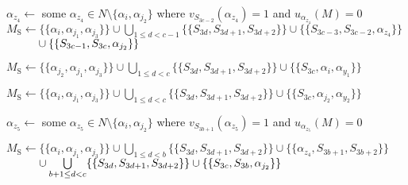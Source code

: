 \begin{breakablealgorithm}
\begin{algorithmic}
\vspace*{1.5pt}

\State $\alpha_{z_4} \gets$ some $\alpha_{z_4} \in N\setminus \{ \alpha_i, \alpha_{j_2} \}$ where $v_{S_{3c-2}}(\alpha_{z_4})=1 $ and $ u_{\alpha_{z_4}}(M)=0$
\vspace*{1.5pt}
\State $M_{\textrm{S}} \gets \{\{ \alpha_i, \alpha_{j_1}, \alpha_{j_3} \}\} \cup \bigcup\limits_{1 \leq d < c - 1}\{ \{ S_{3d}, S_{3d+1}, S_{3d+2} \} \} \cup \{\{ S_{3c-3}, S_{3c-2}, \alpha_{z_4} \}\}$
\State $\hphantom{M' \gets } \cup \{\{ S_{3c-1}, S_{3c}, \alpha_{j_2} \}\}$

\vspace*{1.5pt}

\State $M_{\textrm{S}} \gets \{\{ \alpha_{j_2}, \alpha_{j_1}, \alpha_{j_3} \}\} \cup \bigcup\limits_{1 \leq d < c}\{ \{ S_{3d}, S_{3d+1}, S_{3d+2} \} \} \cup \{\{ S_{3c}, \alpha_i, \alpha_{y_1} \}\}$

\vspace*{1.5pt}

\State $M_{\textrm{S}} \gets \{\{ \alpha_{i}, \alpha_{j_1}, \alpha_{j_3} \}\} \cup \bigcup\limits_{1 \leq d < c}\{ \{ S_{3d}, S_{3d+1}, S_{3d+2} \} \} \cup \{\{ S_{3c}, \alpha_{j_2}, \alpha_{y_2} \}\}$

\vspace*{1.5pt}


\State $\alpha_{z_5} \gets$ some $\alpha_{z_5} \in N\setminus \{ \alpha_i, \alpha_{j_2} \}$ where $v_{S_{3b+1}}(\alpha_{z_5})=1$ and $u_{\alpha_{z_5}}(M)=0$

\vspace*{1.5pt}

\State $M_{\textrm{S}} \gets \{\{ \alpha_i, \alpha_{j_1}, \alpha_{j_3} \}\} 
\cup \bigcup\limits_{1 \leq d < b}\{ \{ S_{3d}, S_{3d+1}, S_{3d+2} \} \}
\cup \{\{ \alpha_{z_4}, S_{3b+1}, S_{3b+2} \}\}$ \State $\hphantom{M' \gets } \cup \bigcup\limits_{b + 1 \leq d < c}\{ \{ S_{3d}, S_{3d+1}, S_{3d+2} \} \}
\cup \{\{ S_{3c}, S_{3b}, \alpha_{j_2} \}\}$


\end{algorithmic}
\end{breakablealgorithm}
